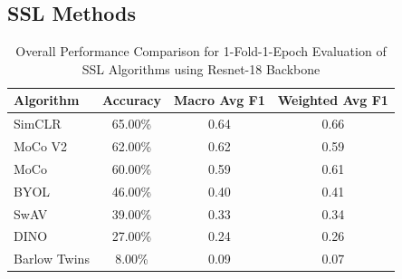 \documentclass[11pt]{article}
\begin{document}
\subsection{SSL Methods}
\begin{table}[ht]
    \centering
    \begin{tabular}{|l|c|c|c|} \hline  
         \textbf{Algorithm}& \textbf{Accuracy}& \textbf{Macro Avg F1}&\textbf{Weighted Avg F1}\\ \hline  
         
         SimCLR& 65.00\%& 0.64 &0.66\\ \hline  
         MoCo V2& 62.00\% & 0.62&0.59\\ \hline  
         MoCo& 60.00\% & 0.59&0.61\\ \hline
         BYOL& 46.00\% & 0.40&0.41\\\hline
         SwAV& 39.00\%& 0.33&0.34\\\hline
         DINO& 27.00\% & 0.24&0.26\\\hline
         Barlow Twins& 8.00\% & 0.09&0.07\\\hline  
    \end{tabular}
    \caption{Overall Performance Comparison for 1-Fold-1-Epoch Evaluation of SSL Algorithms using Resnet-18 Backbone}
\end{table}
\end{document}
